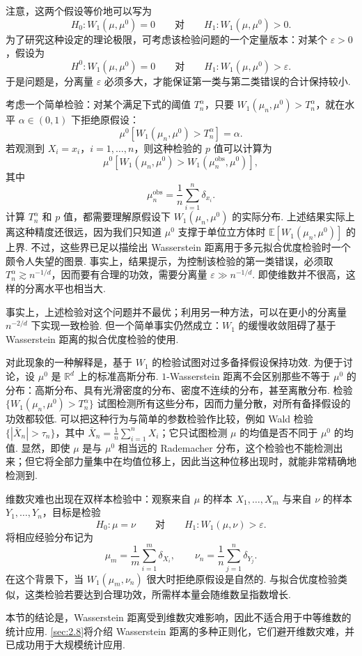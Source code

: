 注意，这两个假设等价地可以写为
$$H_0:W_1(\mu,\mu^0)=0\qquad\text{对}\qquad H_1:W_1(\mu,\mu^0)>0.$$
为了研究这种设定的理论极限，可考虑该检验问题的一个定量版本：对某个 $\varepsilon>0$，假设为
$$H^0:W_1(\mu,\mu^0)=0\qquad\text{对}\qquad H_1:W_1(\mu,\mu^0)>\varepsilon.$$
于是问题是，分离量 $\varepsilon$ 必须多大，才能保证第一类与第二类错误的合计保持较小.

考虑一个简单检验：对某个满足下式的阈值 $T_n^\alpha$，只要 $W_1(\mu_n,\mu^0)>T_n^\alpha$，就在水平 $\alpha\in(0,1)$ 下拒绝原假设：
$$\mu^0[W_1(\mu_n,\mu^0)>T_n^\alpha]=\alpha.$$
若观测到 $X_i=x_i$，$i=1,\ldots,n$，则这种检验的 $p$ 值可以计算为
$$\mu^0[W_1(\mu_n,\mu^0)>W_1(\mu_n^{\mathrm{obs}},\mu^0)],$$
其中
$$\mu_n^{\mathrm{obs}}=\frac1n\sum_{i=1}^n\delta_{x_i}.$$
计算 $T_n^\alpha$ 和 $p$ 值，都需要理解原假设下 $W_1(\mu_n,\mu^0)$ 的实际分布. 上述结果实际上离这种精度还很远，因为我们只知道 $\mu^0$ 支撑于单位立方体时 $\mathbb E[W_1(\mu_n,\mu^0)]$ 的上界. 不过，这些界已足以描绘出 Wasserstein 距离用于多元拟合优度检验时一个颇令人失望的图景. 事实上，结果提示，为控制该检验的第一类错误，必须取 $T_n^\alpha\gtrsim n^{-1/d}$，因而要有合理的功效，需要分离量 $\varepsilon\gg n^{-1/d}$. 即使维数并不很高，这样的分离水平也相当大.

事实上，上述检验对这个问题并不最优；利用另一种方法，可以在更小的分离量 $n^{-2/d}$ 下实现一致检验. 但一个简单事实仍然成立：$W_1$ 的缓慢收敛阻碍了基于 Wasserstein 距离的拟合优度检验的使用.

对此现象的一种解释是，基于 $W_1$ 的检验试图对过多备择假设保持功效. 为便于讨论，设 $\mu^0$ 是 $\mathbb R^d$ 上的标准高斯分布. $1$-Wasserstein 距离不会区别那些不等于 $\mu^0$ 的分布：高斯分布、具有光滑密度的分布、密度不连续的分布，甚至离散分布. 检验 $\{W_1(\mu_n,\mu^0)>T_n^\alpha\}$ 试图检测所有这些分布，因而力量分散，对所有备择假设的功效都较低. 可以把这种行为与简单的参数检验作比较，例如 Wald 检验 $\{|\bar X_n|>\tau_n\}$，其中 $\bar X_n=\frac1n\sum_{i=1}^nX_i$；它只试图检测 $\mu$ 的均值是否不同于 $\mu^0$ 的均值. 显然，即使 $\mu$ 是与 $\mu^0$ 相当远的 Rademacher 分布，这个检验也不能检测出来；但它将全部力量集中在均值位移上，因此当这种位移出现时，就能非常精确地检测到.

维数灾难也出现在双样本检验中：观察来自 $\mu$ 的样本 $X_1,\ldots,X_m$ 与来自 $\nu$ 的样本 $Y_1,\ldots,Y_n$，目标是检验
$$H_0:\mu=\nu\qquad\text{对}\qquad H_1:W_1(\mu,\nu)>\varepsilon.$$
将相应经验分布记为
$$\mu_m=\frac1m\sum_{i=1}^m\delta_{X_i},\qquad\nu_n=\frac1n\sum_{j=1}^n\delta_{Y_j}.$$
在这个背景下，当 $W_1(\mu_m,\nu_n)$ 很大时拒绝原假设是自然的. 与拟合优度检验类似，这类检验若要达到合理功效，所需样本量会随维数呈指数增长.

本节的结论是，Wasserstein 距离受到维数灾难影响，因此不适合用于中等维数的统计应用. \autoref{sec:2.8}将介绍 Wasserstein 距离的多种正则化，它们避开维数灾难，并已成功用于大规模统计应用.
